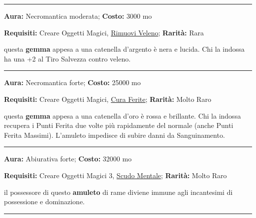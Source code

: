 \begin{multicols}{2}
\smallskip\noindent\rule{\linewidth}{2pt}  \hypertarget{AmuletoAntiveleno}{}\medskip{}\noindent\label{AmuletoAntiveleno}

\textbf{Aura:} Necromantica moderata; \textbf{Costo:} 3000 mo

\textbf{Requisiti:} Creare Oggetti Magici, \hyperlink{Rimuovi Veleno}{Rimuovi Veleno}; \textbf{Rarità:} Rara

questa \textbf{gemma} appesa a una catenella d'argento è nera e lucida. Chi la indossa ha una +2 al Tiro Salvezza contro veleno.

\smallskip\noindent\rule{\linewidth}{2pt}  \hypertarget{AmuletoCicatrizzante}{}\medskip{}\noindent\label{AmuletoCicatrizzante}

\textbf{Aura:} Necromantica forte; \textbf{Costo:} 25000 mo

\textbf{Requisiti:} Creare Oggetti Magici, \hyperlink{Cura Ferite}{Cura Ferite}; \textbf{Rarità:} Molto Raro

questa \textbf{gemma} appesa a una catenella d'oro è rossa e brillante. Chi la indossa recupera i Punti Ferita due volte più rapidamente del normale (anche Punti Ferita Massimi). L'amuleto impedisce di subire danni da Sanguinamento.

\smallskip\noindent\rule{\linewidth}{2pt}  \hypertarget{AmuletoControlaPossessione}{}\medskip{}\noindent\label{AmuletoControlaPossessione}

\textbf{Aura:} Abiurativa forte; \textbf{Costo:} 32000 mo

\textbf{Requisiti:} Creare Oggetti Magici 3, \hyperlink{AnellodelloScudoMentale}{Scudo Mentale}; \textbf{Rarità:} Molto Raro

il possessore di questo \textbf{amuleto} di rame diviene immune agli incantesimi di possessione e dominazione.

\smallskip\noindent\rule{\linewidth}{2pt}  \hypertarget{AmuletodellaCancrena}{}\medskip{}\noindent\label{AmuletodellaCancrena}


\end{multicols}
